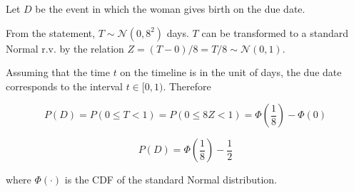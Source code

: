 Let $D$ be the event in which the woman gives birth on the due date.

From the statement, $T \sim \mathcal{N}(0,8^2)$ days.
$T$ can be transformed to a standard Normal r.v. by the relation
$Z = (T-0)/8 = T/8 \sim \mathcal{N}(0,1)$.

Assuming that the time $t$ on the timeline is in the unit of days,
the due date corresponds to the interval $t \in [0,1)$.
Therefore

$$
P(D) = P(0 \le T < 1) = P(0 \le 8Z < 1) = \Phi \left( \frac{1}{8} \right) - \Phi(0)
$$

$$
P(D) = \Phi \left( \frac{1}{8} \right) - \frac{1}{2}
$$

\noindent where $\Phi(\cdot)$ is the CDF of the standard Normal distribution.
